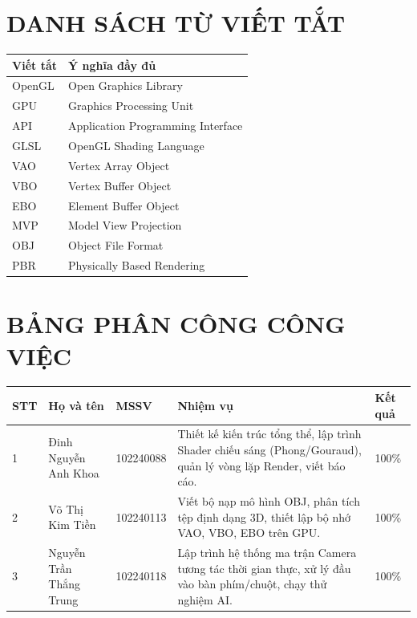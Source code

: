 \documentclass[13pt, a4paper]{extarticle}
\begin{document}
\section*{DANH SÁCH TỪ VIẾT TẮT}
\begin{center}
\begin{longtable}{|p{3cm}|p{10cm}|}
\hline
\textbf{Viết tắt} & \textbf{Ý nghĩa đầy đủ} \\ \hline
OpenGL & Open Graphics Library \\ \hline
GPU & Graphics Processing Unit \\ \hline
API & Application Programming Interface \\ \hline
GLSL & OpenGL Shading Language \\ \hline
VAO & Vertex Array Object \\ \hline
VBO & Vertex Buffer Object \\ \hline
EBO & Element Buffer Object \\ \hline
MVP & Model View Projection \\ \hline
OBJ & Object File Format \\ \hline
PBR & Physically Based Rendering \\ \hline
\end{longtable}
\end{center}

\newpage
\section*{BẢNG PHÂN CÔNG CÔNG VIỆC}
\begin{center}
\begin{longtable}{|p{1cm}|p{4.5cm}|p{2cm}|p{5cm}|p{1.5cm}|}
\hline
\textbf{STT} & \textbf{Họ và tên} & \textbf{MSSV} & \textbf{Nhiệm vụ} & \textbf{Kết quả} \\ \hline
1 & Đinh Nguyễn Anh Khoa & 102240088 & Thiết kế kiến trúc tổng thể, lập trình Shader chiếu sáng (Phong/Gouraud), quản lý vòng lặp Render, viết báo cáo. & 100\% \\ \hline
2 & Võ Thị Kim Tiền & 102240113 & Viết bộ nạp mô hình OBJ, phân tích tệp định dạng 3D, thiết lập bộ nhớ VAO, VBO, EBO trên GPU. & 100\% \\ \hline
3 & Nguyễn Trần Thắng Trung & 102240118 & Lập trình hệ thống ma trận Camera tương tác thời gian thực, xử lý đầu vào bàn phím/chuột, chạy thử nghiệm AI. & 100\% \\ \hline
\end{longtable}
\end{center}
\end{document}
